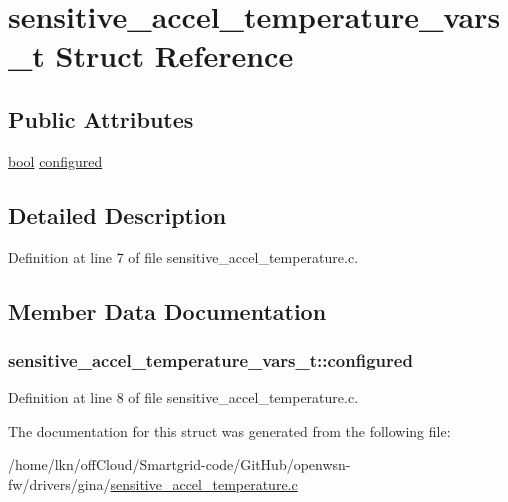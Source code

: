 \hypertarget{structsensitive__accel__temperature__vars__t}{}\section{sensitive\+\_\+accel\+\_\+temperature\+\_\+vars\+\_\+t Struct Reference}
\label{structsensitive__accel__temperature__vars__t}
\subsection*{Public Attributes}
\begin{DoxyCompactItemize}
\item 
\hyperlink{_p_e___types_8h_a97a80ca1602ebf2303258971a2c938e2}{bool} \hyperlink{structsensitive__accel__temperature__vars__t_aec7521a128cf9f59cf51523fa0cca964}{configured}
\end{DoxyCompactItemize}


\subsection{Detailed Description}


Definition at line 7 of file sensitive\+\_\+accel\+\_\+temperature.\+c.



\subsection{Member Data Documentation}
\subsubsection[{\texorpdfstring{configured}{configured}}]{ sensitive\+\_\+accel\+\_\+temperature\+\_\+vars\+\_\+t\+::configured}\hypertarget{structsensitive__accel__temperature__vars__t_aec7521a128cf9f59cf51523fa0cca964}{}\label{structsensitive__accel__temperature__vars__t_aec7521a128cf9f59cf51523fa0cca964}


Definition at line 8 of file sensitive\+\_\+accel\+\_\+temperature.\+c.



The documentation for this struct was generated from the following file\+:\begin{DoxyCompactItemize}
\item 
/home/lkn/off\+Cloud/\+Smartgrid-\/code/\+Git\+Hub/openwsn-\/fw/drivers/gina/\hyperlink{sensitive__accel__temperature_8c}{sensitive\+\_\+accel\+\_\+temperature.\+c}\end{DoxyCompactItemize}
